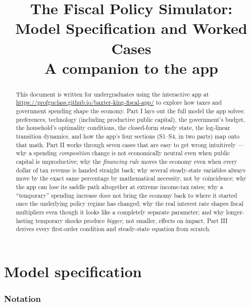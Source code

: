 \documentclass[11pt]{article}
\title{The Fiscal Policy Simulator:\\
Model Specification and Worked Cases\\
\large A companion to the app}
\author{}
\date{}
\begin{document}
\maketitle

\begin{abstract}
\noindent This document is written for undergraduates using the interactive
app at \url{https://profguclass.github.io/baxter-king-fiscal-app/} to explore how taxes and
government spending shape the economy. Part I lays out the full model the app solves: preferences,
technology (including productive public capital), the government's budget, the household's optimality conditions,
the closed-form steady state, the log-linear transition dynamics, and how
the app's four sections (S1--S4, in two parts) map onto that math. Part II works
through seven cases that are easy to get wrong intuitively --- why a
spending \emph{composition} change is not economically neutral even when
public capital is unproductive; why the \emph{financing rule} moves the
economy even when every dollar of tax revenue is handed straight back; why
several steady-state variables always move by the exact same percentage by
mathematical necessity, not by coincidence; why the app can lose its
saddle path altogether at extreme income-tax rates; why a ``temporary''
spending increase does not bring the economy back to where it started
once the underlying policy regime has changed; why the real interest
rate shapes fiscal multipliers even though it looks like a completely
separate parameter; and why longer-lasting temporary shocks produce
\emph{bigger}, not smaller, effects on impact. Part III derives
every first-order condition and steady-state equation from scratch.
\end{abstract}

\tableofcontents

\part{Model specification}

\section{Notation}
\end{document}
